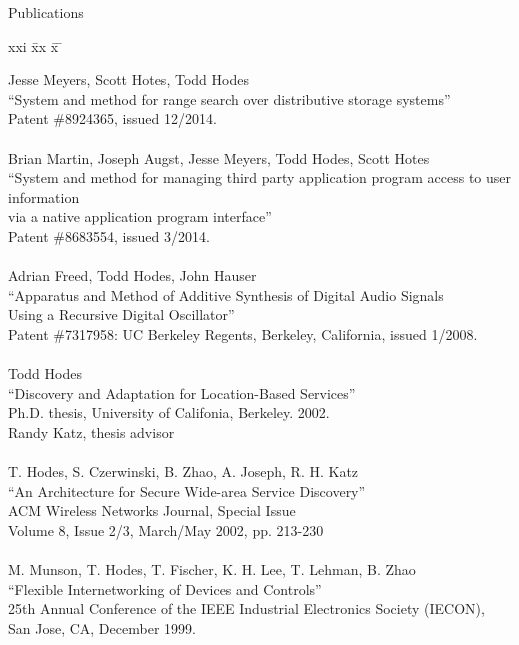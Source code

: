 \begin{bf} \large
Publications
\end{bf}
\begin{tabbing}
xxi \= xx \= x \= \kill

\>    Jesse Meyers, Scott Hotes, Todd Hodes \\
\>\>      ``System and method for range search over distributive storage systems'' \\
\>\>    Patent \#8924365, issued 12/2014. \\

\smallskip \\[-3pt]
\>    Brian Martin, Joseph Augst, Jesse Meyers, Todd Hodes, Scott Hotes \\
\>\>      ``System and method for managing third party application program access to user information \\
\>\>      via a native application program interface'' \\
\>\>    Patent \#8683554, issued 3/2014. \\

\smallskip \\[-3pt]
\>    Adrian Freed, Todd Hodes, John Hauser \\
\>\>      ``Apparatus and Method of Additive Synthesis of Digital Audio Signals \\
\>\>   Using a Recursive Digital Oscillator'' \\
\>\>    Patent \#7317958: UC Berkeley Regents, Berkeley, California, issued 1/2008. \\

\smallskip \\[-3pt]
\>    Todd Hodes \\
\>\>      ``Discovery and Adaptation for Location-Based Services'' \\
\>\>    Ph.D. thesis, University of Califonia, Berkeley. 2002. \\
\>\>    Randy Katz, thesis advisor \\

\smallskip \\[-3pt]
\>    T. Hodes, S. Czerwinski, B. Zhao, A. Joseph, R. H. Katz \\
\>\>      ``An Architecture for Secure Wide-area Service Discovery'' \\
\>\>       ACM Wireless Networks Journal, Special Issue \\
\>\>       Volume 8, Issue 2/3, March/May 2002, pp. 213-230 \\

\smallskip \\[-3pt]
\>   M. Munson, T. Hodes, T. Fischer, K. H. Lee, T. Lehman, B. Zhao \\
\>\>      ``Flexible Internetworking of Devices and Controls'' \\
\>\>        25th Annual Conference of the IEEE Industrial Electronics Society (IECON),  \\
\>\>	    San Jose, CA, December 1999. \\

\end{tabbing}
